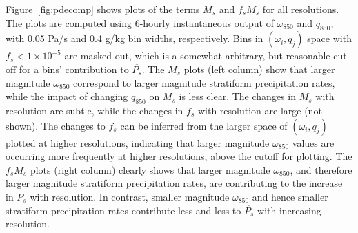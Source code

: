 \documentclass[times]{qjrms4}
\begin{document}
Figure~\ref{fig:pdecomp} shows plots of the terms $M_s$ and $f_s M_s$ for all resolutions. The plots are computed using 6-hourly instantaneous output of $\omega_{850}$ and $q_{850}$, with 0.05 Pa/s and 0.4 g/kg bin widths, respectively. Bins in  $\left( \omega_{i} , q_{j} \right)$ space with $f_s <1 \times 10^{-5}$ are masked out, which is a somewhat arbitrary, but reasonable cut-off for a bins' contribution to $\overline{P_s}$. The $M_s$ plots (left column) show that larger magnitude $\omega_{850}$ correspond to larger magnitude stratiform precipitation rates, while the impact of changing $q_{850}$ on $M_s$ is less clear. The changes in $M_s$ with resolution are subtle, while the changes in $f_s$ with resolution are large (not shown). The changes to $f_s$ can be inferred from the larger space of $\left( \omega_i , q_j \right)$ plotted at higher resolutions, indicating that larger magnitude $\omega_{850}$ values are occurring more frequently at higher resolutions, above the cutoff for plotting. The $f_s M_s$ plots (right column) clearly shows that larger magnitude $\omega_{850}$, and therefore larger magnitude stratiform precipitation rates, are contributing to the increase in $\overline{P_s}$ with resolution. In contrast, smaller magnitude $\omega_{850}$ and hence smaller stratiform precipitation rates contribute less and less to $\overline{P_s}$ with increasing resolution.
\end{document}
